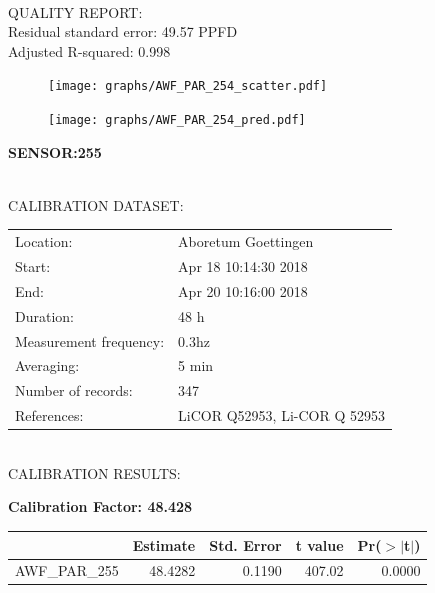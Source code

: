 \documentclass[oneside]{report}
\begin{document}
\hrulefill\\
QUALITY REPORT:\\
Residual standard error: 49.57 PPFD\\
Adjusted R-squared: 0.998



\begin{figure}[H]
  \centering
  \texttt{[image: graphs/AWF\_PAR\_254\_scatter.pdf]}
\end{figure}




\begin{figure}[H]
  \centering
  \texttt{[image: graphs/AWF\_PAR\_254\_pred.pdf]}
\end{figure}

\pagebreak


\begin{center}
\large{\textbf{SENSOR:255}}\\
\end{center}

\hrulefill\\
CALIBRATION DATASET:\\
\begin{table}[h!]
  \centering
  \label{tab:table1}
  \begin{tabular}{ll}
    Location: & Aboretum Goettingen\\ 
    
    
    Start:  & Apr 18 10:14:30 2018 \\
    End:   & Apr 20 10:16:00 2018\\ 
    Duration: & 48 h\\
    Measurement frequency: & 0.3hz\\
    Averaging:  &5 min\\
    Number of records: & 347 \\
    References: & LiCOR Q52953, Li-COR Q 52953 \\
  \end{tabular}
\end{table}

\hrulefill\\
CALIBRATION RESULTS:\\


\begin{center}
\textbf{\large{Calibration Factor: 48.428}}\\
\end{center}
\begin{table}[ht]
\centering
\begin{tabular}{rrrrr}
  \hline
 & Estimate & Std. Error & t value & Pr($>$$|$t$|$) \\ 
  \hline
AWF\_PAR\_255 & 48.4282 & 0.1190 & 407.02 & 0.0000 \\ 
   \hline
\end{tabular}
\end{table}
\end{document}
